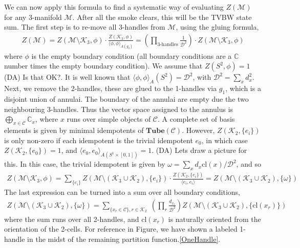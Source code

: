 \documentclass[12pt,a4paper]{article}
\newcommand{\cc}{\mathbb{C}}
\newcommand{\mcd}{\mathcal{D}}
\newcommand{\mcc}{\mathcal{C}}
\newcommand{\mck}{\mathcal{K}}
\newcommand{\mcm}{\mathcal{M}}
\newcommand{\tube}{\textbf{Tube}}
\newcommand{\dave}[1]{{\color{ao(english)}\footnotesize{(DA) #1}}}
\begin{document}
We can now apply this formula to find a systematic way of evaluating $Z(\mcm)$ for any 3-manifold $\mcm$.
After all the smoke clears, this will be the TVBW state sum.
The first step is to re-move all 3-handles from $\mcm$, using the gluing formula, 
\begin{align}
Z(\mcm) = Z(\mcm \setminus \mck_3, \phi) \cdot \frac{Z(\mck_3, \phi)}{\langle \phi,\phi \rangle_{A(g_2)} }= \left(\prod_{\text{3-handles}} \frac{1}{\mcd^2} \right) \cdot Z(\mcm \setminus \mck_3, \phi)
\end{align}
where $\phi$ is the empty boundary condition (all boundary conditions are a $\cc$ number times the empty boundary condition). 
We assume that $Z(S^2,\phi) = 1$ \dave{Is that OK?}.
It is well known that $\langle \phi , \phi \rangle_A(S^2) = \mcd^2$, with $\mcd^2 = \sum_x d_x^2$.
Next, we remove the 2-handles, these are glued to the 1-handles via $g_1$, which is a disjoint union of annulai. 
The boundary of the annulai are empty due the two neighbouring 3-handles. 
Thus the vector space assigned to the annulus is $\bigoplus_{x\in \mcc} \cc_x$, 
where $x$ runs over simple objects of $\mcc$. 
A complete set of basis elements is given by minimal idempotents of $\tube(\mcc)$. 
However, $Z(\mck_2,\{e_{i}\})$ is only non-zero if each idempotent is the trivial idempotent $e_0$, in which case $Z(\mck_2, \{e_0 \}) = 1$, and $\langle e_0, e_0 \rangle_{A(S^1 \times [0,1])} =1$.
\dave{Lets draw a picture for this.}
In this case, the trivial idempotent is given by $\omega = \sum_x d_x \text{cl}(x)/\mcd^2$, 
and so
\begin{align}
Z(\mcm \setminus \mck_3, \phi) = \sum_{\{ e_i \}} Z(\mcm \setminus (\mck_3 \cup \mck_2),\{ e_{i} \}) \cdot \frac{Z(\mck_2, \{ e_i \})}{\langle e_i, e_i \rangle} = Z(\mcm \setminus(\mck_3 \cup \mck_2),\{ \omega \})
\end{align}
The last expression can be turned into a sum over all boundary conditions, 
\begin{align}
Z(\mcm \setminus(\mck_3 \cup \mck_2),\{ \omega \}) = \sum_{\{x_{r} \in \mcc \}, r \in \mck_2}\;  \left( \prod_r \frac{d_{x_r} }{\mcd^2} \right) Z(\mcm \setminus(\mck_3 \cup \mck_2),\{ \text{cl}(x_{r}) \} )
\end{align}
where the sum runs over all 2-handles, and $\text{cl}(x_r)$ is naturally oriented from the orientation of the 2-cells.
For reference in Figure, we have shown a labeled 1-handle in the midst of the remaining partition function.\ref{OneHandle}. 
\end{document}
